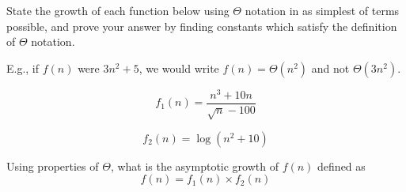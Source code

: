 \begin{prob}
    State the growth of each function below using $\Theta$ notation in as
    simplest of terms possible, and prove your answer by finding constants
    which satisfy the definition of $\Theta$ notation.

    E.g., if $f(n)$ were $3n^2 + 5$, we would write $f(n) = \Theta(n^2)$ and not $\Theta(3n^2)$.

    \begin{subprobset}
        \begin{subprob}
            \[
            f_1(n) = \frac{n^3 + 10 n}{\sqrt{n}-100}
            \]
        \end{subprob}
        
        \begin{subprob}
            \[
                f_2(n)=\log(n^2 + 10)
            \]
        \end{subprob}
        \begin{subprob}
        Using properties of $\Theta$, what is the asymptotic growth of $f(n)$ defined as
            \[ f(n)=f_1(n)\times f_2(n)\]
        \end{subprob}
    \end{subprobset}
    
    
    \begin{soln}
    
    \end{soln}
    
\end{prob}

